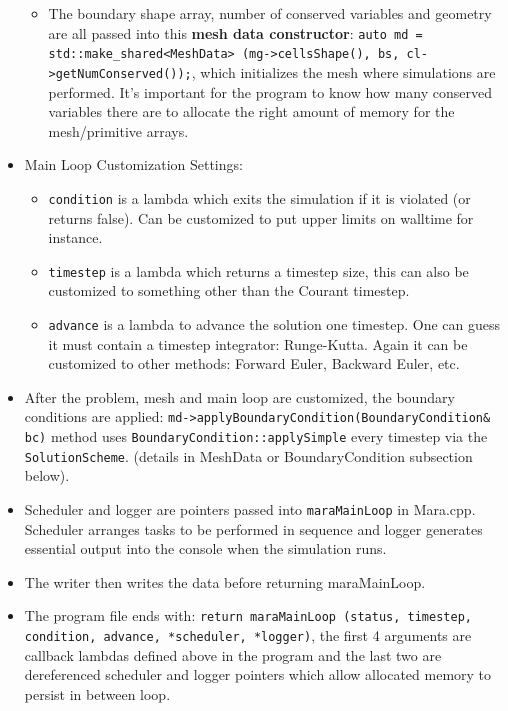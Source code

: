 \documentclass{article}
\begin{document}
\begin{itemize}
\begin{itemize}
		\item The boundary shape array, number of conserved variables and geometry are all passed into this \textbf{mesh data constructor}: \texttt{auto md = std::make\_shared<MeshData> (mg->cellsShape(), bs, cl->getNumConserved());}, which initializes the mesh where simulations are performed. It's important for the program to know how many conserved variables there are to allocate the right amount of memory for the mesh/primitive arrays.
	\end{itemize}
	
	\item Main Loop Customization Settings:
	\begin{itemize}
		\item \texttt{condition} is a lambda which exits the simulation if it is violated (or returns false). Can be customized to put upper limits on walltime for instance.
		
		\item \texttt{timestep} is a lambda which returns a timestep size, this can also be customized to something other than the Courant timestep.
		
		\item \texttt{advance} is a lambda to advance the solution one timestep. One can guess it must contain a timestep integrator: Runge-Kutta. Again it can be customized to other methods: Forward Euler, Backward Euler, etc. 		
	\end{itemize}		
	
	\item After the problem, mesh and main loop are customized, the boundary conditions are applied: \texttt{md->applyBoundaryCondition(BoundaryCondition\& bc)} method uses  \texttt{BoundaryCondition::applySimple} every timestep via the \texttt{SolutionScheme}. (details in MeshData or BoundaryCondition subsection below). 
	
	\item Scheduler and logger are pointers passed into \texttt{maraMainLoop} in Mara.cpp. Scheduler arranges tasks to be performed in sequence and logger generates essential output into the console when the simulation runs. 
	
	\item The writer then writes the data before returning maraMainLoop.
		
	\item The program file ends with: \texttt{return maraMainLoop (status, timestep, condition, advance, *scheduler, *logger)}, the first 4 arguments are callback lambdas defined above in the program and the last two are dereferenced scheduler and logger pointers which allow allocated memory to persist in between loop.
	

\end{itemize}
\end{document}
